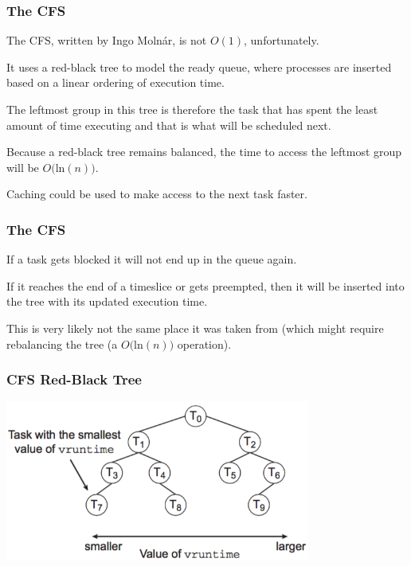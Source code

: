 \begin{frame}
\frametitle{The CFS}

The CFS, written by Ingo Moln\'ar, is not $O(1)$, unfortunately. 

It uses a red-black tree to model the ready queue, where processes are inserted based on a linear ordering of execution time. 

The leftmost group in this tree is therefore the task that has spent the least amount of time executing and that is what will be scheduled next. 

Because a red-black tree remains balanced, the time to access the leftmost group will be $O($ln$(n))$.

Caching could be used to make access to the next task faster.


\end{frame}

\begin{frame}
\frametitle{The CFS}

If a task gets blocked it will not end up in the queue again. 

If it reaches the end of a timeslice or gets preempted, then it will be inserted into the tree with its updated execution time.

This is very likely not the same place it was taken from (which might require rebalancing the tree (a $O($ln$(n))$ operation).


\end{frame}

\begin{frame}
\frametitle{CFS Red-Black Tree}

\begin{center}
	\includegraphics[width=0.75\textwidth]{images/cfs.png}
\end{center}


\end{frame}

